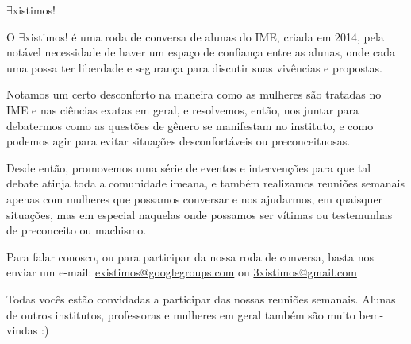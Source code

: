 \begin{subsecao}{$\exists$xistimos!}

O $\exists$xistimos! é uma roda de conversa de alunas do IME, criada em 2014, pela notável necessidade de haver um espaço de confiança entre as alunas, onde cada uma possa ter liberdade e segurança para discutir suas vivências e propostas.

Notamos um certo desconforto na maneira como as mulheres são tratadas no IME e nas ciências exatas em geral, e resolvemos, então, nos juntar para debatermos como as questões de gênero se manifestam no instituto, e como podemos agir para evitar situações desconfortáveis ou preconceituosas.

Desde então, promovemos uma série de eventos e intervenções para que tal debate atinja toda a comunidade imeana, e também realizamos reuniões semanais apenas com mulheres que possamos conversar e nos ajudarmos, em quaisquer situações, mas em especial naquelas onde possamos ser vítimas ou testemunhas de preconceito ou machismo.

Para falar conosco, ou para participar da nossa roda de conversa, basta nos enviar um e-mail: \url{existimos@googlegroups.com} ou \url{3xistimos@gmail.com}

Todas vocês estão convidadas a participar das nossas reuniões semanais. Alunas de outros institutos, professoras e mulheres em geral também são muito bem-vindas :)

\end{subsecao}
